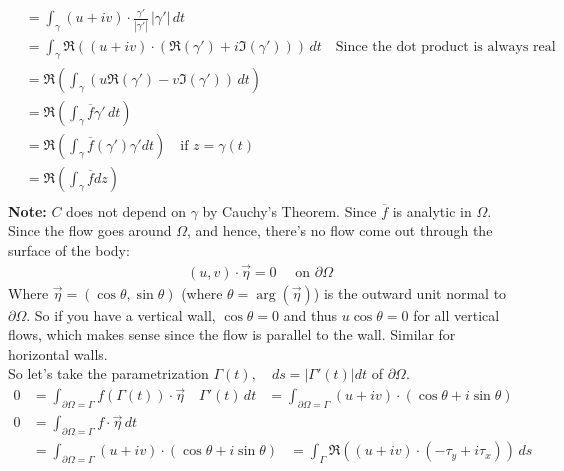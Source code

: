 \begin{example}
\begin{align*}
          & = \int_\gamma (u + iv) \cdot \frac{\gamma'}{|\gamma'|} \, |\gamma'| \, dt                                                \\
          & = \int_\gamma \Re((u + iv) \cdot (\Re(\gamma') + i\Im(\gamma'))) \, dt \quad \text{Since the dot product is always real} \\
          & = \Re(\int_\gamma (u\Re(\gamma') - v\Im(\gamma')) \, dt)                                                                 \\
          & = \Re(\int_\gamma \overline{f} \gamma' \, dt)                                                                            \\
          & =\Re\left(\int_\gamma \overline{f} (\gamma')\gamma'dt\right) \quad \text{if } z = \gamma(t)                              \\
          & = \Re\left(\int_\gamma \overline{f} dz\right)                                                                            \\
    \end{align*}
    \textbf{Note:} $C$ does not depend on $\gamma$ by Cauchy's Theorem. Since $\overline{f}$ is analytic in $\Omega$.
    Since the flow goes around $\Omega$, and hence, there's no flow come out through the surface of the body:
    \begin{align*}
        (u,v) \cdot \vec{\eta} = 0 \quad \text{ on } \partial \Omega
    \end{align*}
    Where $\vec{\eta} = (\cos\theta, \sin\theta)$ (where $\theta = \arg(\vec{\eta})$) is the outward unit normal to $\partial \Omega$. So if you have a vertical wall, $\cos \theta = 0$ and thus $u\cos\theta = 0$ for all vertical flows, which makes sense since the flow is parallel to the wall. Similar for horizontal walls.\\
    So let's take the parametrization $\Gamma(t), \quad ds = |\Gamma'(t)|dt$ of $\partial \Omega$.
    \begin{align*}
        0 & = \int_{\partial \Omega =\Gamma} f(\Gamma(t)) \cdot \vec{\eta} \quad \Gamma'(t) \, dt
          & = \int_{\partial \Omega =\Gamma} (u + iv) \cdot (\cos\theta + i\sin\theta)
    \end{align*}
    \begin{align*}
        0 & = \int_{\partial \Omega =\Gamma} f \cdot \vec{\eta} \, dt                             \\
          & = \int_{\partial \Omega =\Gamma} (u + iv) \cdot (\cos\theta + i\sin\theta)
          & = \int_{\Gamma} \Re((u + iv) \cdot (-\tau_y + i\tau_x)) \, ds                         \\

\end{align*}
\end{example}
